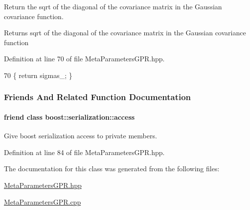 Return the sqrt of the diagonal of the covariance matrix in the Gaussian covariance function. 

\begin{DoxyReturn}{Returns}
sqrt of the diagonal of the covariance matrix in the Gaussian covariance function 
\end{DoxyReturn}


Definition at line 70 of file Meta\+Parameters\+G\+P\+R.\+hpp.


\begin{DoxyCode}
70 \{ \textcolor{keywordflow}{return} sigmas\_; \}
\end{DoxyCode}


\subsubsection{Friends And Related Function Documentation}
\hypertarget{classDmpBbo_1_1MetaParametersGPR_ac98d07dd8f7b70e16ccb9a01abf56b9c}{
\paragraph[{boost\+::serialization\+::access}]{\setlength{\rightskip}{0pt plus 5cm}friend class boost\+::serialization\+::access\hspace{0.3cm}{\ttfamily [friend]}}}\label{classDmpBbo_1_1MetaParametersGPR_ac98d07dd8f7b70e16ccb9a01abf56b9c}


Give boost serialization access to private members. 



Definition at line 84 of file Meta\+Parameters\+G\+P\+R.\+hpp.



The documentation for this class was generated from the following files\+:\begin{DoxyCompactItemize}
\item 
\hyperlink{MetaParametersGPR_8hpp}{Meta\+Parameters\+G\+P\+R.\+hpp}\item 
\hyperlink{MetaParametersGPR_8cpp}{Meta\+Parameters\+G\+P\+R.\+cpp}\end{DoxyCompactItemize}
